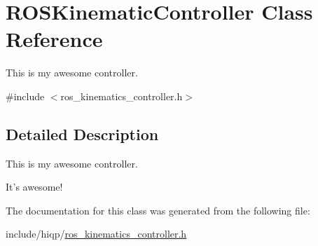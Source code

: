 \hypertarget{classROSKinematicController}{\section{R\-O\-S\-Kinematic\-Controller Class Reference}
\label{classROSKinematicController}
}


This is my awesome controller.  




{\ttfamily \#include $<$ros\-\_\-kinematics\-\_\-controller.\-h$>$}



\subsection{Detailed Description}
This is my awesome controller. 

It's awesome! 

The documentation for this class was generated from the following file\-:\begin{DoxyCompactItemize}
\item 
include/hiqp/\hyperlink{ros__kinematics__controller_8h}{ros\-\_\-kinematics\-\_\-controller.\-h}\end{DoxyCompactItemize}
